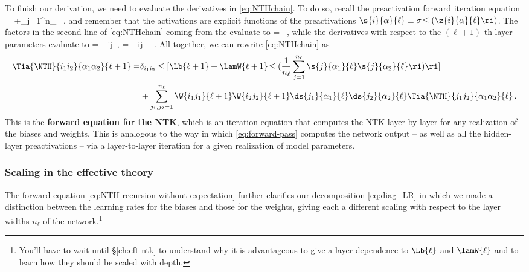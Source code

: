 To finish our derivation, we need to evaluate the derivatives in \eqref{eq:NTHchain}. To do so,
recall the preactivation forward iteration equation
\be\label{eq:forward-pass}
 = +\sum_{j=1}^{n_{\ell}} \, ,
\ee
and remember that the activations are explicit functions of the preactivations $\s{i}{\alpha}{\ell}\equiv\sigma\!\le(\z{i}{\alpha}{\ell}\ri)$.
The factors in the second line of \eqref{eq:NTHchain} 
coming from the  evaluate to
\be\label{eq:chain-rule-factor}
 =  \, ,
\ee
while the derivatives with respect to the $(\ell+1)$-th-layer parameters evaluate to
\be\label{eq:same-layer-derivatives}
 = \delta_{ij}\, , \qquad {} = \delta_{ij} \,  \, .
\ee
All together, we can rewrite \eqref{eq:NTHchain} as
\begin{align}\label{eq:NTH-recursion-without-expectation}
\Tia{\NTH}{i_1i_2}{\alpha_1\alpha_2}{\ell+1}=&\delta_{i_1i_2} \le[\Lb{\ell+1} +  \lamW{\ell+1}\!\le(\frac{1}{n_{\ell}}\sum_{j=1}^{n_{\ell}} \s{j}{\alpha_1}{\ell} \s{j}{\alpha_2}{\ell} \ri) \ri]\, \\
&+  \sum_{j_1,j_2=1}^{n_{\ell}} \W{i_1j_1}{\ell+1} \W{i_2j_2}{\ell+1}  \ds{j_1}{\alpha_1}{\ell} \ds{j_2}{\alpha_2}{\ell} \Tia{\NTH}{j_1j_2}{\alpha_1\alpha_2}{\ell}\, .\nonumber
\end{align}
This is the \textbf{forward equation for the NTK}, which is an iteration equation that computes the NTK  layer by layer  for any realization of the biases and weights. This is analogous to the way in which \eqref{eq:forward-pass} computes the network output -- as well as all the hidden-layer preactivations -- via a layer-to-layer iteration for a given realization of model parameters.


\subsubsection{Scaling in the effective theory}
The forward equation \eqref{eq:NTH-recursion-without-expectation} further clarifies our decomposition \eqref{eq:diag_LR} in which we made a distinction between the learning rates for the biases and those for the weights, giving each a different scaling with respect to the layer widths $n_\ell$ of the network.\footnote{You'll have to wait until \S\ref{ch:eft-ntk} to understand why it is advantageous to give a layer dependence to $\Lb{\ell}$ and $\lamW{\ell}$ and to learn how they should be scaled with depth.}


